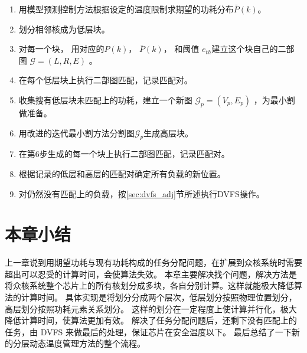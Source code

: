 \begin{enumerate}
\item 用模型预测控制方法根据设定的温度限制求期望的功耗分布$\bar{P}(k)$。
\item 划分相邻核成为低层块。
\item 对每一个块， 用对应的$P(k)$， $\bar{P}(k)$，  和阈值 $e_{th}$建立这个块自己的二部图 $\mathcal{G} = (L, R, E)$ 。
\item 在每个低层块上执行二部图匹配，记录匹配对。
\item 收集搜有低层块未匹配上的功耗，建立一个新图 $\mathcal{G}_p = (V_p, E_p)$ ，为最小割做准备。
\item 用改进的迭代最小割方法分割图$\mathcal{G}_p$生成高层块。 
\item 在第6步生成的每一个块上执行二部图匹配，记录匹配对。
\item 根据记录的低层和高层的匹配对确定所有负载的新位置。
\item 对仍然没有匹配上的负载，按\ref{sec:dvfs_adj}节所述执行DVFS操作。
\end{enumerate}
\section{本章小结}\label{sec:xiaojie5}
上一章说到用期望功耗与现有功耗构成的任务分配问题，在扩展到众核系统时需要超出可以忍受的计算时间，会使算法失效。
本章主要解决找个问题，解决方法是将众核系统整个芯片上的所有核划分成多块，各自分别计算。这样就能极大降低算法的计算时间。
具体实现是将划分分成两个层次，低层划分按照物理位置划分，高层划分按照功耗元素关系划分。
这样的划分在一定程度上使计算并行化，极大降低计算时间，使算法更加有效。
解决了任务分配问题后，还剩下没有匹配上的任务，由 DVFS 来做最后的处理，保证芯片在安全温度以下。
最后总结了一下新的分层动态温度管理方法的整个流程。














































